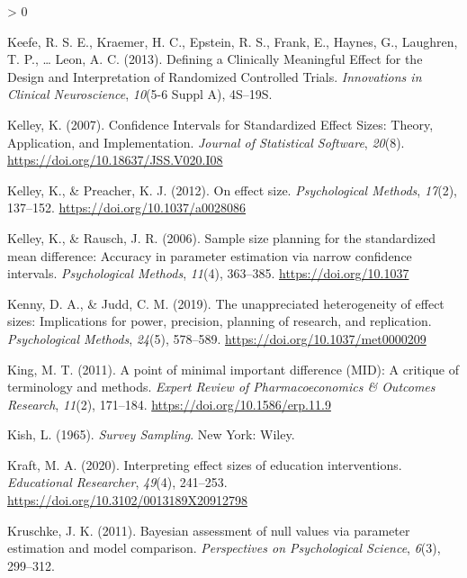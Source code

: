 \documentclass[
  english,
  ,jou,floatsintext]{apa6}
\newlength{\cslhangindent}
\newenvironment{CSLReferences}[2] %
 {%
  \setlength{\parindent}{0pt}
  \ifodd #1 \everypar{\setlength{\hangindent}{\cslhangindent}}\ignorespaces\fi
  \ifnum #2 > 0
  \setlength{\parskip}{#2\baselineskip}
  \fi
 }%
 {}
\begin{document}
\begin{CSLReferences}{1}{0}
\leavevmode\hypertarget{ref-keefe_defining_2013}{}%
Keefe, R. S. E., Kraemer, H. C., Epstein, R. S., Frank, E., Haynes, G., Laughren, T. P., \ldots{} Leon, A. C. (2013). Defining a {Clinically Meaningful Effect} for the {Design} and {Interpretation} of {Randomized Controlled Trials}. \emph{Innovations in Clinical Neuroscience}, \emph{10}(5-6 Suppl A), 4S--19S.

\leavevmode\hypertarget{ref-kelley_confidence_2007}{}%
Kelley, K. (2007). Confidence {Intervals} for {Standardized Effect Sizes}: {Theory}, {Application}, and {Implementation}. \emph{Journal of Statistical Software}, \emph{20}(8). \url{https://doi.org/10.18637/JSS.V020.I08}

\leavevmode\hypertarget{ref-kelley_effect_2012}{}%
Kelley, K., \& Preacher, K. J. (2012). On effect size. \emph{Psychological Methods}, \emph{17}(2), 137--152. \url{https://doi.org/10.1037/a0028086}

\leavevmode\hypertarget{ref-kelley_sample_2006}{}%
Kelley, K., \& Rausch, J. R. (2006). Sample size planning for the standardized mean difference: Accuracy in parameter estimation via narrow confidence intervals. \emph{Psychological Methods}, \emph{11}(4), 363--385. \url{https://doi.org/10.1037}

\leavevmode\hypertarget{ref-kenny_unappreciated_2019}{}%
Kenny, D. A., \& Judd, C. M. (2019). The unappreciated heterogeneity of effect sizes: {Implications} for power, precision, planning of research, and replication. \emph{Psychological Methods}, \emph{24}(5), 578--589. \url{https://doi.org/10.1037/met0000209}

\leavevmode\hypertarget{ref-king_point_2011}{}%
King, M. T. (2011). A point of minimal important difference ({MID}): A critique of terminology and methods. \emph{Expert Review of Pharmacoeconomics \& Outcomes Research}, \emph{11}(2), 171--184. \url{https://doi.org/10.1586/erp.11.9}

\leavevmode\hypertarget{ref-kish_survey_1965}{}%
Kish, L. (1965). \emph{Survey {Sampling}}. {New York}: {Wiley}.

\leavevmode\hypertarget{ref-kraft_interpreting_2020}{}%
Kraft, M. A. (2020). Interpreting effect sizes of education interventions. \emph{Educational Researcher}, \emph{49}(4), 241--253. \url{https://doi.org/10.3102/0013189X20912798}

\leavevmode\hypertarget{ref-kruschke_bayesian_2011}{}%
Kruschke, J. K. (2011). Bayesian assessment of null values via parameter estimation and model comparison. \emph{Perspectives on Psychological Science}, \emph{6}(3), 299--312.


\end{CSLReferences}
\end{document}

